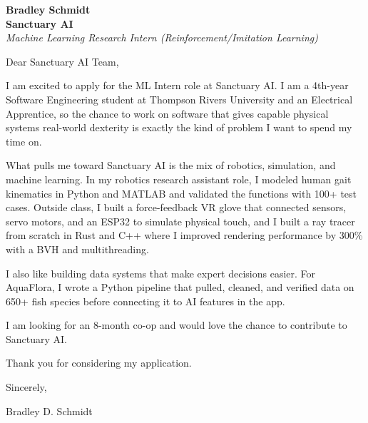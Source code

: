 \documentclass[11pt]{article}
\begin{document}
\textbf{Bradley Schmidt}\\
\vspace{0.5em}
\textbf{Sanctuary AI}\\
\textit{Machine Learning Research Intern (Reinforcement/Imitation Learning)}

Dear Sanctuary AI Team,

\par

I am excited to apply for the ML Intern role at Sanctuary AI. I am a 4th-year Software Engineering student at Thompson Rivers University and an Electrical Apprentice, so the chance to work on software that gives capable physical systems real-world dexterity is exactly the kind of problem I want to spend my time on.

\par

What pulls me toward Sanctuary AI is the mix of robotics, simulation, and machine learning. In my robotics research assistant role, I modeled human gait kinematics in Python and MATLAB and validated the functions with 100+ test cases. Outside class, I built a force-feedback VR glove that connected sensors, servo motors, and an ESP32 to simulate physical touch, and I built a ray tracer from scratch in Rust and C++ where I improved rendering performance by 300\% with a BVH and multithreading.

\par

I also like building data systems that make expert decisions easier. For AquaFlora, I wrote a Python pipeline that pulled, cleaned, and verified data on 650+ fish species before connecting it to AI features in the app.

\par

I am looking for an 8-month co-op and would love the chance to contribute to Sanctuary AI.

\par

Thank you for considering my application.

\par

Sincerely,

\par

Bradley D. Schmidt
\end{document}
